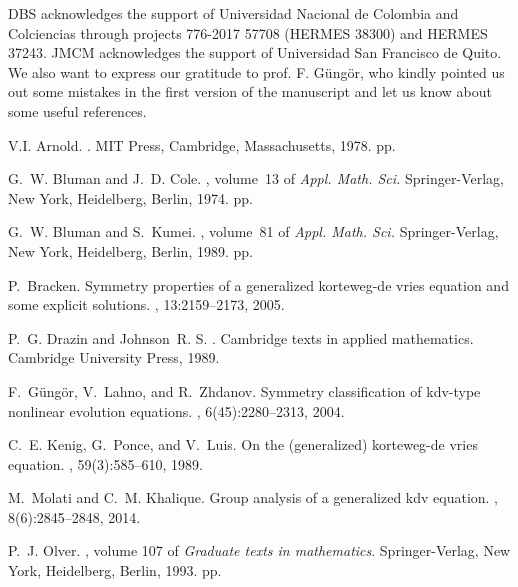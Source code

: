 \documentclass[
11pt,%
tightenlines,%
twoside,%
onecolumn,%
nofloats,%
nobibnotes,%
nofootinbib,%
superscriptaddress,%
noshowpacs,%
centertags]%
{revtex4}
\begin{document}
\begin{acknowledgments}
DBS acknowledges the support of Universidad Nacional de Colombia and Colciencias through projects 776-2017 57708 (HERMES 38300) and HERMES 37243. JMCM acknowledges the support of Universidad San Francisco de Quito.
We also want to express our gratitude to prof. F. G\"ung\"or, who kindly pointed us out some mistakes in the first version of the manuscript and let us know about some useful references.
\end{acknowledgments}

\begin{thebibliography}{20}

V.I. Arnold.
.
\newblock MIT Press, Cambridge, Massachusetts, 1978.
 pp.

G.~W. Bluman and J.~D. Cole.
, volume~13 of
  {\em Appl. Math. Sci.}
\newblock Springer-Verlag, New York, Heidelberg, Berlin, 1974.
 pp.

G.~W. Bluman and S.~Kumei.
, volume~81 of {\em Appl.
  Math. Sci.}
\newblock Springer-Verlag, New York, Heidelberg, Berlin, 1989.
 pp.

P.~Bracken.
\newblock Symmetry properties of a generalized korteweg-de vries equation and
  some explicit solutions.
, 13:2159--2173, 2005.

P.~G. Drazin and Johnson~R. S.
.
\newblock Cambridge texts in applied mathematics. Cambridge University Press,
  1989.

F.~G\"ung\"or, V.~Lahno, and R.~Zhdanov.
\newblock Symmetry classification of kdv-type nonlinear evolution equations.
, 6(45):2280--2313, 2004.

C.~E. Kenig, G.~Ponce, and V.~Luis.
\newblock On the (generalized) korteweg-de vries equation.
, 59(3):585--610, 1989.

M.~Molati and C.~M. Khalique.
\newblock Group analysis of a generalized kdv equation.
, 8(6):2845--2848, 2014.

P.~J. Olver.
, volume
  107 of {\em Graduate texts in mathematics}.
\newblock Springer-Verlag, New York, Heidelberg, Berlin, 1993.
 pp.


\end{thebibliography}
\end{document}

